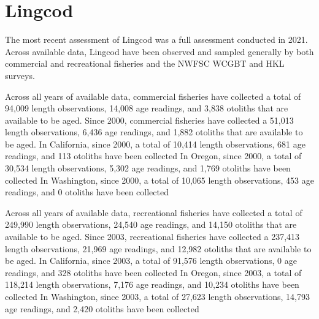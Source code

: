 \documentclass[11pt,
  english,
  letterpaper,
]{article}
\begin{document}
\hypertarget{lingcod}{%
\section{Lingcod}\label{lingcod}}

\leavevmode\tagmcend\tagstructend


The most recent assessment of Lingcod was a full assessment conducted in 2021. Across available data, Lingcod have been observed and sampled generally by both commercial and recreational fisheries and the NWFSC WCGBT and HKL surveys.

\leavevmode\tagmcend\tagstructend\par


Across all years of available data, commercial fisheries have collected a total of 94,009 length observations, 14,008 age readings, and 3,838 otoliths that are available to be aged. Since 2000, commercial fisheries have collected a 51,013 length observations, 6,436 age readings, and 1,882 otoliths that are available to be aged. In California, since 2000, a total of 10,414 length observations, 681 age readings, and 113 otoliths have been collected In Oregon, since 2000, a total of 30,534 length observations, 5,302 age readings, and 1,769 otoliths have been collected In Washington, since 2000, a total of 10,065 length observations, 453 age readings, and 0 otoliths have been collected

\leavevmode\tagmcend\tagstructend\par


Across all years of available data, recreational fisheries have collected a total of 249,990 length observations, 24,540 age readings, and 14,150 otoliths that are available to be aged. Since 2003, recreational fisheries have collected a 237,413 length observations, 21,969 age readings, and 12,982 otoliths that are available to be aged. In California, since 2003, a total of 91,576 length observations, 0 age readings, and 328 otoliths have been collected In Oregon, since 2003, a total of 118,214 length observations, 7,176 age readings, and 10,234 otoliths have been collected In Washington, since 2003, a total of 27,623 length observations, 14,793 age readings, and 2,420 otoliths have been collected

\leavevmode\tagmcend\tagstructend\par
\end{document}
